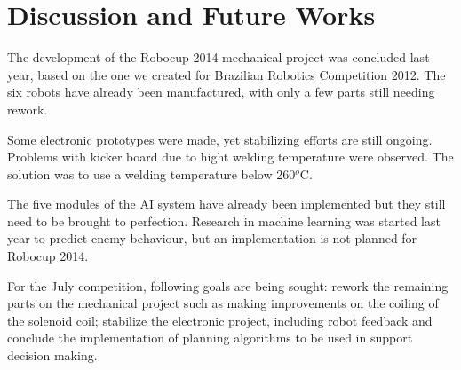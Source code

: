 \section{Discussion and Future Works}\label{dic_fut_sec}
The development of the Robocup 2014 mechanical project was concluded last year,
based on the one we created for Brazilian Robotics Competition 2012. The six
robots have already been manufactured, with only a few parts still needing rework.

Some electronic prototypes were made, yet stabilizing efforts are still ongoing.
Problems with kicker board due to hight welding temperature were observed. The solution
was to use a welding temperature below 260$^o$C.

The five modules of the AI system have already been implemented but they still
need to be brought to perfection. Research in machine learning was started last year to predict enemy behaviour,
but an implementation is not planned for Robocup 2014.

For the July competition, following goals are being sought:
rework the remaining parts on the mechanical project such as making improvements on the coiling of the solenoid coil;
stabilize the electronic project, including robot feedback and
conclude the implementation of planning algorithms to be used in support decision making.
